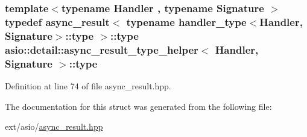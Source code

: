 \subsubsection[{type}]{\setlength{\rightskip}{0pt plus 5cm}template$<$typename Handler , typename Signature $>$ typedef {\bf async\+\_\+result}$<$ typename {\bf handler\+\_\+type}$<$Handler, Signature$>$\+::{\bf type} $>$\+::{\bf type} {\bf asio\+::detail\+::async\+\_\+result\+\_\+type\+\_\+helper}$<$ Handler, Signature $>$\+::{\bf type}}\label{structasio_1_1detail_1_1async__result__type__helper_ab4aec755509972e47a6ea9d6f88b5b74}


Definition at line 74 of file async\+\_\+result.\+hpp.



The documentation for this struct was generated from the following file\+:\begin{DoxyCompactItemize}
\item 
ext/asio/\hyperlink{async__result_8hpp}{async\+\_\+result.\+hpp}\end{DoxyCompactItemize}
